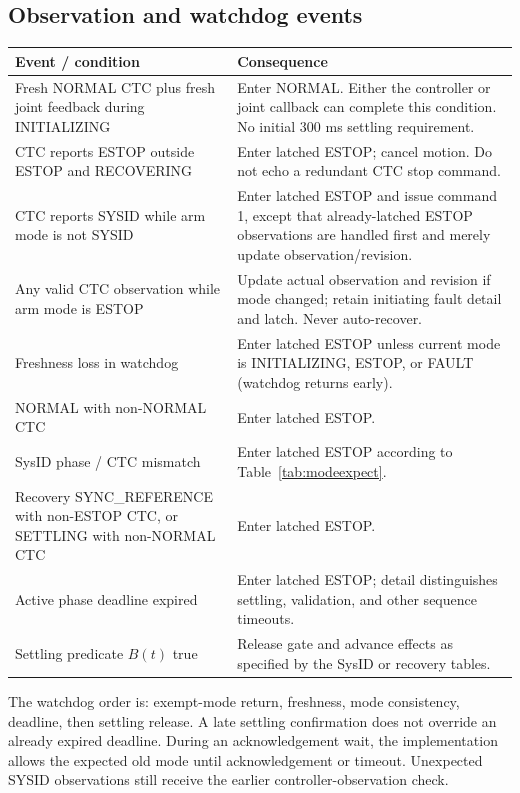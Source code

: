 \documentclass[11pt,a4paper]{report}
\begin{document}
\subsection{Observation and watchdog events}
\begin{longtable}{L{.37\linewidth}L{.56\linewidth}}
\toprule Event / condition & Consequence \\\midrule\endhead
Fresh NORMAL CTC plus fresh joint feedback during INITIALIZING & Enter NORMAL. Either the controller or joint callback can complete this condition. No initial 300 ms settling requirement. \\
CTC reports ESTOP outside ESTOP and RECOVERING & Enter latched ESTOP; cancel motion. Do not echo a redundant CTC stop command. \\
CTC reports SYSID while arm mode is not SYSID & Enter latched ESTOP and issue command 1, except that already-latched ESTOP observations are handled first and merely update observation/revision. \\
Any valid CTC observation while arm mode is ESTOP & Update actual observation and revision if mode changed; retain initiating fault detail and latch. Never auto-recover. \\
Freshness loss in watchdog & Enter latched ESTOP unless current mode is INITIALIZING, ESTOP, or FAULT (watchdog returns early). \\
NORMAL with non-NORMAL CTC & Enter latched ESTOP. \\
SysID phase / CTC mismatch & Enter latched ESTOP according to Table~\ref{tab:modeexpect}. \\
Recovery SYNC\_REFERENCE with non-ESTOP CTC, or SETTLING with non-NORMAL CTC & Enter latched ESTOP. \\
Active phase deadline expired & Enter latched ESTOP; detail distinguishes settling, validation, and other sequence timeouts. \\
Settling predicate $B(t)$ true & Release gate and advance effects as specified by the SysID or recovery tables. \\
\bottomrule
\end{longtable}
The watchdog order is: exempt-mode return, freshness, mode consistency, deadline, then settling release. A late settling confirmation does not override an already expired deadline. During an acknowledgement wait, the implementation allows the expected old mode until acknowledgement or timeout. Unexpected SYSID observations still receive the earlier controller-observation check.
\end{document}
